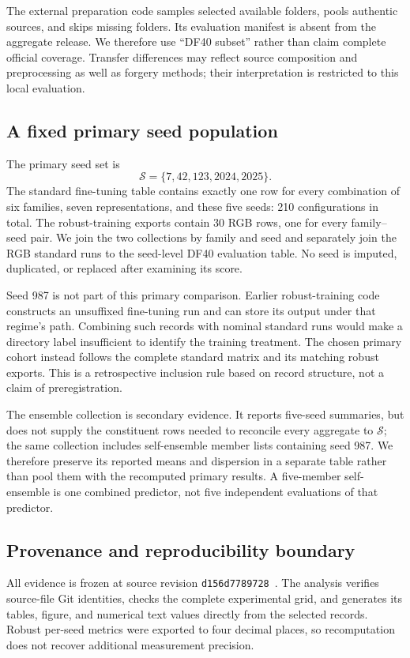 \documentclass[conference,10pt,letterpaper]{IEEEtran}
\begin{document}
The external preparation code samples selected available folders, pools authentic sources, and skips missing folders. Its evaluation manifest is absent from the aggregate release. We therefore use ``DF40 subset'' rather than claim complete official coverage. Transfer differences may reflect source composition and preprocessing as well as forgery methods; their interpretation is restricted to this local evaluation.

\subsection{A fixed primary seed population}
\label{sec:population}
The primary seed set is
\begin{equation}
\mathcal{S}=\{7,42,123,2024,2025\}.
\end{equation}
The standard fine-tuning table contains exactly one row for every combination of six families, seven representations, and these five seeds: 210 configurations in total. The robust-training exports contain 30 RGB rows, one for every family--seed pair. We join the two collections by family and seed and separately join the RGB standard runs to the seed-level DF40 evaluation table. No seed is imputed, duplicated, or replaced after examining its score.

Seed 987 is not part of this primary comparison. Earlier robust-training code constructs an unsuffixed fine-tuning run and can store its output under that regime's path. Combining such records with nominal standard runs would make a directory label insufficient to identify the training treatment. The chosen primary cohort instead follows the complete standard matrix and its matching robust exports. This is a retrospective inclusion rule based on record structure, not a claim of preregistration.

The ensemble collection is secondary evidence. It reports five-seed summaries, but does not supply the constituent rows needed to reconcile every aggregate to $\mathcal{S}$; the same collection includes self-ensemble member lists containing seed 987. We therefore preserve its reported means and dispersion in a separate table rather than pool them with the recomputed primary results. A five-member self-ensemble is one combined predictor, not five independent evaluations of that predictor.

\subsection{Provenance and reproducibility boundary}
All evidence is frozen at source revision \texttt{d156d7789728}~\cite{release2026}. The analysis verifies source-file Git identities, checks the complete experimental grid, and generates its tables, figure, and numerical text values directly from the selected records. Robust per-seed metrics were exported to four decimal places, so recomputation does not recover additional measurement precision.
\end{document}
